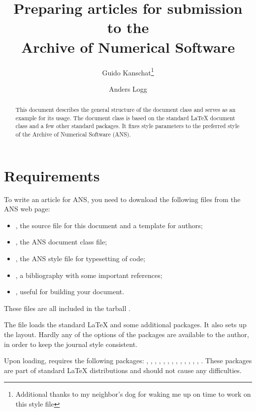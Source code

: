 \documentclass{ansarticle}
\title{Preparing articles for submission to the \\
       Archive of Numerical Software}
\author[1]{Guido Kanschat\thanks{Additional thanks to my neighbor's dog
  for waking me up on time to work on this style file}}
\author[2]{Anders Logg}
\affil[1]{IWR, Universit\"at Heidelberg}
\affil[2]{Simula Research Laboratory}
\begin{document}

\maketitle

\begin{abstract}
  This document describes the general structure of the
   document class and serves as an example for its
  usage. The  document class is based on the standard
  \LaTeX{}  document class and a few other standard
  packages. It fixes style parameters to the preferred style of the
  Archive of Numerical Software (ANS).
\end{abstract}

\section{Requirements}

To write an article for ANS, you need to download the following files
from the ANS web page:
\begin{itemize}
\item
  , the source file for this document and a template for
  authors;
\item
  , the ANS document class file;
\item
  , the ANS style file for typesetting of code;
\item
  , a bibliography with some important
  references;
\item
  , useful for building your document.
\end{itemize}
These files are all included in the tarball .

The file  loads the standard LaTeX
 and some additional packages. It also sets up the
layout. Hardly any of the options of the packages are available to the
author, in order to keep the journal style consistent.

Upon loading,  requires the following packages:
,
, , ,
,
, ,
,
,
,
,
,
,
.
These packages are part of standard \LaTeX{} distributions and should
not cause any difficulties.
\end{document}
